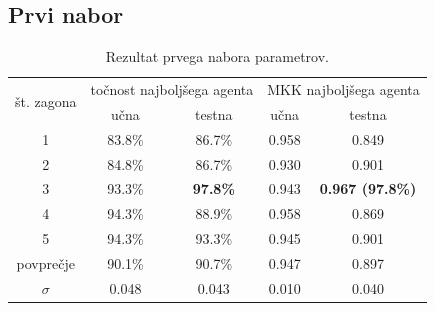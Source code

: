 \subsection{Prvi nabor}\label{subsec:dodatek-iris-prvi-nabor}
\begin{table}[H]
    \begin{center}
        \begin{tabular}{|| c | c c || c c ||}
            \hline
            \multirow{2}{*}{št. zagona} & \multicolumn{2}{c||}{točnost najboljšega agenta} & \multicolumn{2}{c||}{MKK najboljšega agenta} \\ \cline{2-5}
            & učna   & testna          & učna  & testna                  \\
            \hline
            1         & 83.8\% & 86.7\%          & 0.958 & 0.849                   \\
            \hline
            2         & 84.8\% & 86.7\%          & 0.930 & 0.901                   \\
            \hline
            3         & 93.3\% & \textbf{97.8\%} & 0.943 & \textbf{0.967 (97.8\%)} \\
            \hline
            4         & 94.3\% & 88.9\%          & 0.958 & 0.869                   \\
            \hline
            5         & 94.3\% & 93.3\%          & 0.945 & 0.901                   \\
            \hline
            povprečje & 90.1\% & 90.7\%          & 0.947 & 0.897                   \\
            \hline
            $\sigma$  & 0.048  & 0.043           & 0.010 & 0.040                   \\
            \hline
        \end{tabular}
    \end{center}
    \caption{Rezultat prvega nabora parametrov.}
    \label{tab:iris_result_1}
\end{table}

